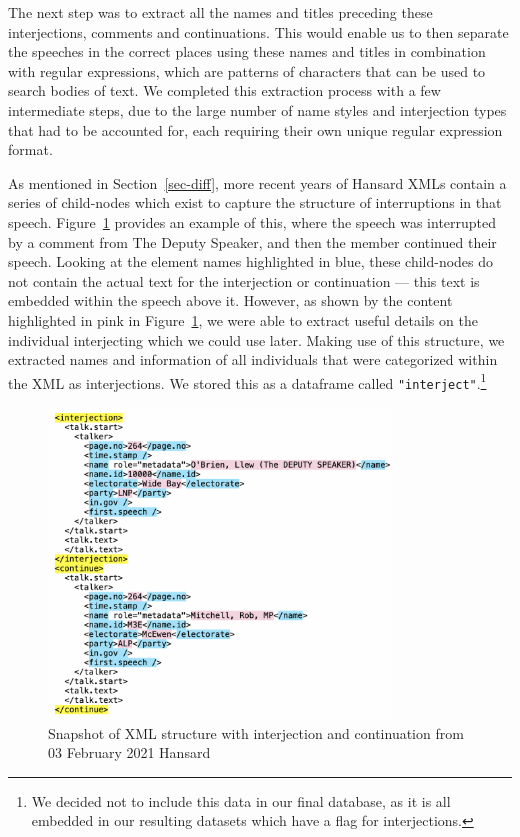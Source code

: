 \documentclass[
  letterpaper,
  DIV=11,
  numbers=noendperiod]{scrartcl}
\begin{document}
The next step was to extract all the names and titles preceding these
interjections, comments and continuations. This would enable us to then
separate the speeches in the correct places using these names and titles
in combination with regular expressions, which are patterns of
characters that can be used to search bodies of text. We completed this
extraction process with a few intermediate steps, due to the large
number of name styles and interjection types that had to be accounted
for, each requiring their own unique regular expression format.

As mentioned in Section~\ref{sec-diff}, more recent years of Hansard
XMLs contain a series of child-nodes which exist to capture the
structure of interruptions in that speech. Figure~\ref{fig-xml3}
provides an example of this, where the speech was interrupted by a
comment from The Deputy Speaker, and then the member continued their
speech. Looking at the element names highlighted in blue, these
child-nodes do not contain the actual text for the interjection or
continuation --- this text is embedded within the speech above it.
However, as shown by the content highlighted in pink in
Figure~\ref{fig-xml3}, we were able to extract useful details on the
individual interjecting which we could use later. Making use of this
structure, we extracted names and information of all individuals that
were categorized within the XML as interjections. We stored this as a
dataframe called \texttt{"interject"}.\footnote{We decided not to
  include this data in our final database, as it is all embedded in our
  resulting datasets which have a flag for interjections.}

\begin{figure}

{\centering \includegraphics[width=3.59375in,height=\textheight]{images/xml3.png}

}

\caption{\label{fig-xml3}Snapshot of XML structure with interjection and
continuation from 03 February 2021 Hansard}

\end{figure}
\end{document}

